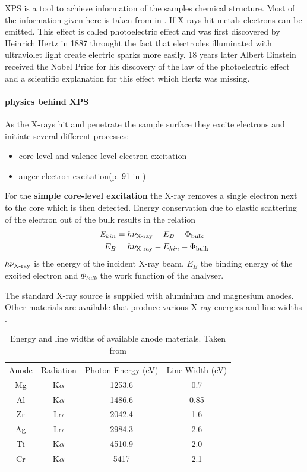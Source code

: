 \label{sec:XPS} XPS is a tool to achieve information of the samples chemical structure.
Most of the information given here is taken from \cite{Riviere_90} in \cite{briggs_auger_1990}.
If X-rays hit metals electrons can be emitted. This effect is called photoelectric effect and was first discovered by Heinrich Hertz in 1887 throught the fact that electrodes illuminated with ultraviolet light create electric sparks more easily\cite{hertz_ueber_1887}. 18 years later Albert Einstein received the Nobel Price for his discovery of the law of the photoelectric effect\cite{_nobel_2015} and a scientific explanation for this effect which Hertz was missing.

\paragraph{physics behind XPS}
As the X-rays hit and penetrate the sample surface they excite electrons and initiate several different processes:
\begin{itemize}
 \item core level and valence level electron excitation
 \item auger electron excitation(p. 91 in \cite{Briggs_90})
\end{itemize}
\label{XPS}
For the \textbf{simple core-level excitation} the X-ray removes a single electron next to the core which is then detected. Energy conservation due to elastic scattering of the electron out of the bulk results in the relation 
\begin{align}
E_{kin} &= h\nu_{\textnormal{X-ray}}-E_{B}-\Phi_{\textnormal{bulk}} \\
E_B 	&=h\nu_{\textnormal{X-ray}}-E_{kin}-\Phi_{\textnormal{bulk}}
\end{align}
 $h\nu_{\textnormal{X-ray}}$ is the energy of the incident X-ray beam, $E_B$ the binding energy of the excited electron and $\Phi_{bulk}$ the work function of the analyser. 
 
The standard X-ray source is supplied with aluminium and magnesium anodes. Other materials are available that produce various X-ray energies and line widths  \cite{_x-ray_2015}. 
\begin{table}\caption{Energy and line widths of available anode materials. Taken from }
 \centering
 \begin{tabular}{cccc}
Anode 	& 	Radiation 	& Photon Energy (eV) 	& Line Width (eV) \\
Mg	&	K$\alpha$ 	&	1253.6	&	0.7\\
Al	&	K$\alpha$ 	&	1486.6 	&	0.85\\
Zr 	&	L$\alpha$ 	&	2042.4 	&	1.6\\
Ag 	&	L$\alpha$ 	&	2984.3 	&	2.6\\
Ti 	&	K$\alpha$ 	&	4510.9 	&	2.0\\
Cr	&	K$\alpha$ 	&	5417 	&	2.1\\
 \end{tabular}
\end{table}

